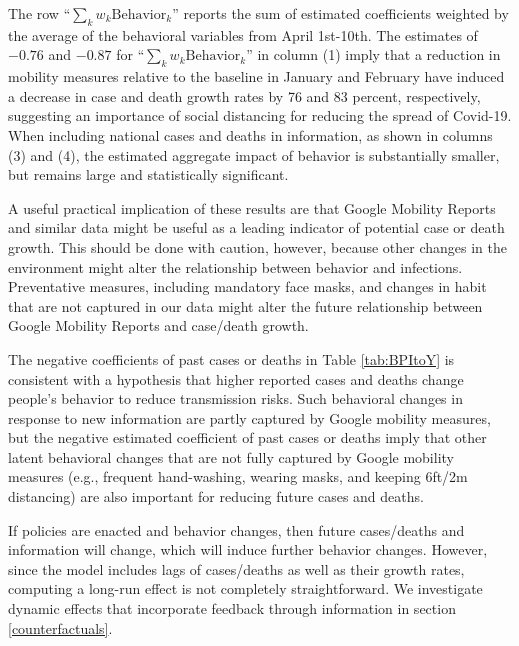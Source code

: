 \documentclass[11pt,reqno,letter]{amsart}
\theoremstyle{definition}
\begin{document}
The row ``$\sum_k w_k \mathrm{Behavior}_k$'' reports the sum of estimated coefficients weighted by the average of the behavioral
variables from April 1st-10th. The estimates of $-0.76$ and $-0.87$ for ``$\sum_k w_k \mathrm{Behavior}_k$'' in column (1)  imply that a reduction in mobility measures relative to the baseline in January and February have induced a decrease in case and death growth rates by 76 and 83 percent, respectively, suggesting an importance of social distancing for reducing the spread of Covid-19.
When including national cases and deaths in information, as shown in columns (3) and (4), the estimated aggregate impact of behavior is substantially smaller, but remains large and statistically significant.

A useful practical implication of these results are that Google Mobility
Reports and similar data might be useful as a leading indicator of
potential case or death growth. This should be done with caution, however, because other
changes in the environment might alter the relationship between behavior
and infections. Preventative
measures, including mandatory face masks, and changes in habit that are not captured in our data might alter
the future relationship between Google Mobility Reports and case/death growth.


The negative coefficients of past cases or deaths in
Table \ref{tab:BPItoY} is
consistent with a hypothesis that higher reported cases and deaths change people's behavior to reduce transmission risks. Such behavioral changes in response to new information   are
 partly captured by Google mobility measures, but the negative estimated coefficient of past cases or deaths imply that other latent behavioral changes that are not fully captured by Google mobility measures (e.g., frequent hand-washing, wearing masks, and keeping 6ft/2m distancing) are also important for reducing future cases and deaths.

If policies are enacted and behavior changes, then future cases/deaths and
information will change, which will induce further behavior changes.  However, since the model includes lags of cases/deaths as well as their growth rates,  computing a long-run effect is not completely
straightforward. We investigate dynamic effects that incorporate
feedback through information in section \ref{counterfactuals}.
\end{document}
